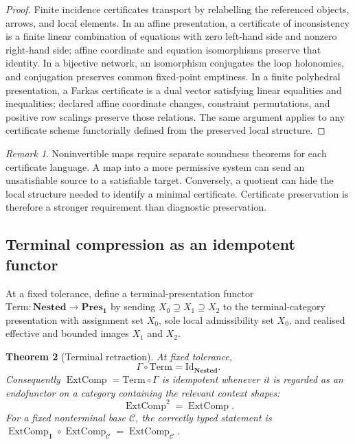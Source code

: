 \documentclass[11pt]{article}
\theoremstyle{plain}
\newtheorem{theorem}{Theorem}[section]
\theoremstyle{definition}
\theoremstyle{remark}
\newtheorem{remark}[theorem]{Remark}
\begin{document}
\begin{proof}
Finite incidence certificates transport by relabelling the referenced objects,
arrows, and local elements. In an affine presentation, a certificate of
inconsistency is a finite linear combination of equations with zero left-hand
side and nonzero right-hand side; affine coordinate and equation isomorphisms
preserve that identity. In a bijective network, an isomorphism conjugates the
loop holonomies, and conjugation preserves common fixed-point emptiness. In a
finite polyhedral presentation, a Farkas certificate is a dual vector satisfying
linear equalities and inequalities; declared affine coordinate changes,
constraint permutations, and positive row scalings preserve those relations. The
same argument applies to any certificate scheme functorially defined from the
preserved local structure.
\end{proof}

\begin{remark}
Noninvertible maps require separate soundness theorems for each certificate
language. A map into a more permissive system can send an unsatisfiable source to
a satisfiable target. Conversely, a quotient can hide the local structure needed
to identify a minimal certificate. Certificate preservation is therefore a
stronger requirement than diagnostic preservation.
\end{remark}

\subsection{Terminal compression as an idempotent functor}

At a fixed tolerance, define a terminal-presentation functor
$\mathrm{Term}:\mathbf{Nested}\to\mathbf{Pres}_{\mathbf 1}$ by sending
$X_0\supseteq X_1\supseteq X_2$ to the terminal-category presentation with
assignment set $X_0$, sole local admissibility set $X_0$, and realised effective
and bounded images $X_1$ and $X_2$.

\begin{theorem}[Terminal retraction]
\label{thm:terminal-retraction-monograph}
At fixed tolerance,
\[
\Gamma\circ\mathrm{Term}=\mathrm{Id}_{\mathbf{Nested}}.
\]
Consequently $\operatorname{ExtComp}=\mathrm{Term}\circ\Gamma$ is idempotent
whenever it is regarded as an endofunctor on a category containing the relevant
context shapes:
\[
\operatorname{ExtComp}^2=\operatorname{ExtComp}.
\]
For a fixed nonterminal base $\mathcal C$, the correctly typed statement is
$\operatorname{ExtComp}_{\mathbf 1}\circ\operatorname{ExtComp}_{\mathcal C}
=\operatorname{ExtComp}_{\mathcal C}$.
\end{theorem}
\end{document}

